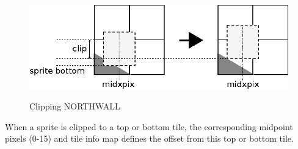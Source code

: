 \documentclass[book.tex]{subfiles}
\begin{document}
\begin{figure}[H]
  \centering
  \includegraphics[width=\textwidth]{imgs/drawings/clipping.eps}
  \label{fig:clipping_north}
  \caption{Clipping NORTHWALL}
\end{figure}

\par
\begin{minipage}{\textwidth}
  
\end{minipage}
\label{wallclip_array}
\par

When a sprite is clipped to a top or bottom tile, the corresponding midpoint pixels (0-15) and tile info map defines the offset from this top or bottom tile.


\par
\begin{minipage}{\textwidth}
  
\end{minipage}
\label{wallclip_array}
\par
\end{document}
